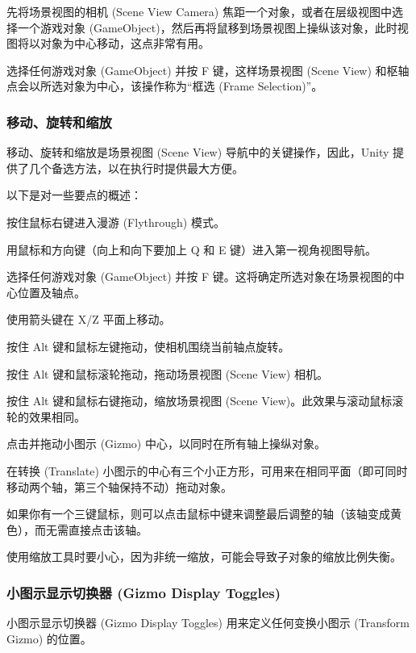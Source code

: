 \documentclass[9pt, b5paper]{article}
\begin{document}
先将场景视图的相机 (Scene View Camera) 焦距一个对象，或者在层级视图中选择一个游戏对象 (GameObject)，然后再将鼠移到场景视图上操纵该对象，此时视图将以对象为中心移动，这点非常有用。

选择任何游戏对象 (GameObject) 并按 F 键，这样场景视图 (Scene View) 和枢轴点会以所选对象为中心，该操作称为“框选 (Frame Selection)”。

\subsubsection{移动、旋转和缩放}
\label{sec:org11a738b}

移动、旋转和缩放是场景视图 (Scene View) 导航中的关键操作，因此，Unity 提供了几个备选方法，以在执行时提供最大方便。

以下是对一些要点的概述：

按住鼠标右键进入漫游 (Flythrough) 模式。

用鼠标和方向键（向上和向下要加上 Q 和 E 键）进入第一视角视图导航。

选择任何游戏对象 (GameObject) 并按 F 键。这将确定所选对象在场景视图的中心位置及轴点。

使用箭头键在 X/Z 平面上移动。

按住 Alt 键和鼠标左键拖动，使相机围绕当前轴点旋转。

按住 Alt 键和鼠标滚轮拖动，拖动场景视图 (Scene View) 相机。

按住 Alt 键和鼠标右键拖动，缩放场景视图 (Scene View)。此效果与滚动鼠标滚轮的效果相同。

点击并拖动小图示 (Gizmo) 中心，以同时在所有轴上操纵对象。

在转换 (Translate) 小图示的中心有三个小正方形，可用来在相同平面（即可同时移动两个轴，第三个轴保持不动）拖动对象。

如果你有一个三键鼠标，则可以点击鼠标中键来调整最后调整的轴（该轴变成黄色），而无需直接点击该轴。

使用缩放工具时要小心，因为非统一缩放，可能会导致子对象的缩放比例失衡。

\subsubsection{小图示显示切换器 (Gizmo Display Toggles)}
\label{sec:org9746a85}

小图示显示切换器 (Gizmo Display Toggles) 用来定义任何变换小图示 (Transform Gizmo) 的位置。
\end{document}
